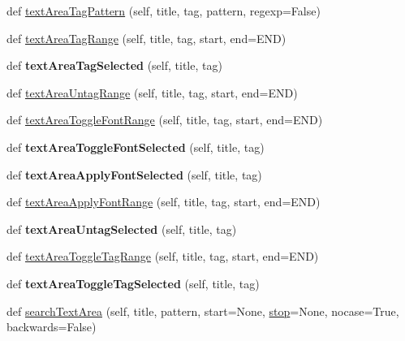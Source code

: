 \begin{DoxyCompactItemize}
def \hyperlink{classappjar_1_1gui_afc40e24a8057d23cc3f5b5c360c5fe10}{text\+Area\+Tag\+Pattern} (self, title, tag, pattern, regexp=False)
\item 
def \hyperlink{classappjar_1_1gui_a6c7976fea10348f7a82f98bb8490d390}{text\+Area\+Tag\+Range} (self, title, tag, start, end=E\+ND)
\item 
\mbox{\label{classappjar_1_1gui_a900e01a300834d9ea177b4ce3aa05a35}} 
def {\bfseries text\+Area\+Tag\+Selected} (self, title, tag)
\item 
def \hyperlink{classappjar_1_1gui_ab9439f8833281ad740d3e16adf0ca660}{text\+Area\+Untag\+Range} (self, title, tag, start, end=E\+ND)
\item 
def \hyperlink{classappjar_1_1gui_a23923fa499597c3ca3279688a31348b7}{text\+Area\+Toggle\+Font\+Range} (self, title, tag, start, end=E\+ND)
\item 
\mbox{\label{classappjar_1_1gui_a170eeb60c92da28a3cf038c461c92b5e}} 
def {\bfseries text\+Area\+Toggle\+Font\+Selected} (self, title, tag)
\item 
\mbox{\label{classappjar_1_1gui_a65daf71e33e96a13f408bc6de51166d7}} 
def {\bfseries text\+Area\+Apply\+Font\+Selected} (self, title, tag)
\item 
def \hyperlink{classappjar_1_1gui_afd3aa54cb1b88d3632114e2e5390f9a5}{text\+Area\+Apply\+Font\+Range} (self, title, tag, start, end=E\+ND)
\item 
\mbox{\label{classappjar_1_1gui_af5a6bec3625a0d6c976e35ba1c70b590}} 
def {\bfseries text\+Area\+Untag\+Selected} (self, title, tag)
\item 
def \hyperlink{classappjar_1_1gui_a25b1227fc3d2c725228793a71ce958dd}{text\+Area\+Toggle\+Tag\+Range} (self, title, tag, start, end=E\+ND)
\item 
\mbox{\label{classappjar_1_1gui_a10faac035dc455933dc7ad4f6ed4095e}} 
def {\bfseries text\+Area\+Toggle\+Tag\+Selected} (self, title, tag)
\item 
def \hyperlink{classappjar_1_1gui_ad01d6ad33f36f7dea2db036885e41d36}{search\+Text\+Area} (self, title, pattern, start=None, \hyperlink{classappjar_1_1gui_a28ff5fbc0aa77aacf692082a00af676b}{stop}=None, nocase=True, backwards=False)
\item 

\end{DoxyCompactItemize}
